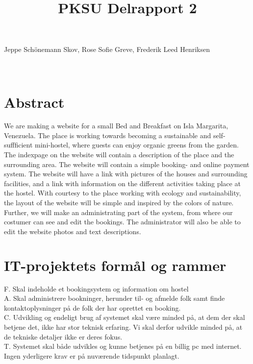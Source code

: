 \documentclass[12pt,a4paper]{article}
\begin{document}
\title{PKSU Delrapport 2}
\maketitle
\begin{center}
Jeppe Schönemann Skov, Rose Sofie Greve, Frederik Leed Henriksen \\ \hfill \\ \hfill \\ 
\end{center}
\newpage
\tableofcontents
\newpage
\section{Abstract}
We are making a website for a small Bed and Breakfast on Isla Margarita, Venezuela. The place is working towards becoming a sustainable and self-suffficient mini-hostel, where guests can enjoy organic greens from the garden.
The indexpage on the website will contain a description of the place and the surrounding area.
The website will contain a simple booking- and online payment system.
The website will have a link with pictures of the houses and surrounding facilities, and a link with information on the different activities taking place at the hostel.
With courtesy to the place working with ecology and sustainability, the layout of the website will be simple and inspired by the colors of nature.
Further, we will make an administrating part of the system, from where our costumer can see and edit the bookings. The administrator will also be able to edit the website photos and text descriptions. 
\newpage
\section{IT-projektets formål og rammer}
F. Skal indeholde et bookingsystem og information om hostel \\

A. Skal administrere bookninger, herunder til- og afmelde folk samt finde kontaktoplysninger på de folk der har oprettet en booking.\\
 
C. Udvikling og endeligt brug af systemet skal være minded på, at dem der skal betjene det, ikke har stor teknisk erfaring. Vi skal derfor udvikle minded på, at de tekniske detaljer ikke er deres fokus.\\

T. Systemet skal både udvikles og kunne betjenes på en billig pc med internet. Ingen yderligere krav er på nuværende tidspunkt planlagt. \\
\end{document}
